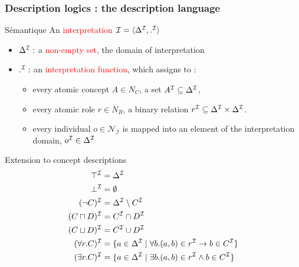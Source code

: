 \documentclass{beamer}
\newcommand{\I}{{\cal{I}}}
\begin{document}
\begin{frame}
\frametitle{Description logics : the description language}

\begin{block}{Sémantique}
\scriptsize
An \textcolor{red}{interpretation} $\I=\langle\Delta^\I, .^\I \rangle$
\begin{itemize}
\scriptsize
\item $\Delta^\I:$ a \textcolor{red}{non-empty set}, the domain of interpretation
\item $.^\I: $ an \textcolor{red}{interpretation function}, which assigns to :
\begin{itemize}
\footnotesize
\item  every atomic concept $A \in N_C$, a set $A^\I \subseteq \Delta^\I$,
\item every atomic role $r \in N_R$, a binary relation $r^\I \subseteq \Delta^\I \times \Delta^\I$.
\item  every individual $o \in \mathcal{N}_{\mathcal{I}} $ is mapped into an element of the interpretation domain, $o^\I \in \Delta^\I$
\end{itemize}
\end{itemize}
\end{block}

\begin{block}{Extension to concept descriptions}
\scriptsize
\[
\begin{aligned}
\top^\I &= \Delta^\I \\
 \bot^\I &=\emptyset\\
(\neg C)^\I &= \Delta^\I \setminus C^\I\\
( C \sqcap D)^\I &= C^\I \cap D^\I\\
( C \sqcup D)^\I &= C^\I \cup D^\I\\
(\forall r.C)^\I &= \{a \in \Delta^\I \mid \forall b. (a,b)\in r^\I \rightarrow b \in C^\I\}\\
(\exists r.C)^\I &= \{a \in \Delta^\I \mid \exists b. (a,b)\in r^\I \wedge b \in C^\I\}\\
\end{aligned}
\]
\end{block}
\end{frame}



 
 
\end{document}
